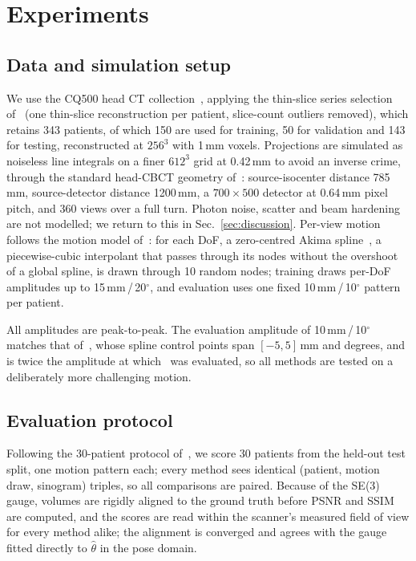 \documentclass[11pt]{article}
\newcommand{\thetahat}{\hat\theta}
\begin{document}
\section{Experiments}
\label{sec:setup}

\subsection{Data and simulation setup}
\label{sec:data}

We use the CQ500 head CT collection~\cite{cq500}, applying the thin-slice series
selection of~\cite{thies25} (one thin-slice reconstruction per patient, slice-count
outliers removed), which retains 343 patients, of which 150 are used for training, 50 for
validation and 143 for testing, reconstructed at $256^3$ with 1\,mm voxels. Projections are simulated as noiseless line integrals on a finer $612^3$ grid at
0.42\,mm to avoid an inverse crime, through the standard head-CBCT geometry
of~\cite{thies25}: source-isocenter distance 785\,mm,
source-detector distance 1200\,mm, a $700\times500$ detector at 0.64\,mm pixel pitch, and
360 views over a full turn. Photon noise, scatter and beam hardening are not modelled; we
return to this in Sec.~\ref{sec:discussion}. Per-view motion follows the motion model
of~\cite{thies25}: for each DoF, a zero-centred Akima spline~\cite{akima70}, a
piecewise-cubic interpolant that passes through its nodes without the overshoot of a global
spline, is drawn through 10 random nodes; training draws per-DoF amplitudes up to 15\,mm\,/\,20$^\circ$, and evaluation uses one
fixed 10\,mm\,/\,10$^\circ$ pattern per patient.

All amplitudes are peak-to-peak. The evaluation amplitude of 10\,mm\,/\,10$^\circ$
matches that of~\cite{depaepe25}, whose spline control points span $[-5,5]$\,mm and
degrees, and is twice the amplitude at which~\cite{thies25} was evaluated, so all methods
are tested on a deliberately more challenging motion.

\subsection{Evaluation protocol}
\label{sec:protocol}

Following the 30-patient protocol of~\cite{thies25}, we score 30 patients from the held-out
test split, one motion pattern each; every method sees identical (patient, motion draw,
sinogram) triples, so all comparisons are paired. Because of the SE(3) gauge, volumes are
rigidly aligned to the ground truth before PSNR and SSIM are computed, and the scores are
read within the scanner's measured field of view for every method alike; the alignment is
converged and agrees with the gauge fitted directly to $\thetahat$ in the pose domain.
\end{document}
